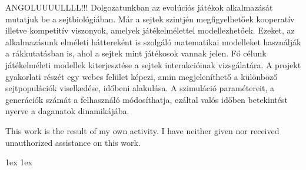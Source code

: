 \documentclass[final]{ubb_dolgozat}
\author{%
Kis Nándor
}
\renewcommand{\baselinestretch}{1.5}
\begin{document}
\begin{abstractEN} %



{	ANGOLUUUULLLL!!!
	Dolgozatunkban az evolúciós játékok alkalmazását mutatjuk be a sejtbiológiában. Már a sejtek szintjén megfigyelhetőek kooperatív illetve kompetitív viszonyok, amelyek játékelmélettel modellezhetőek. Ezeket, az alkalmazásunk elméleti háttereként is szolgáló matematikai modelleket használják a rákkutatásban is, ahol a sejtek mint játékosok vannak jelen. Fő célunk játékelméleti modellek kiterjesztése a sejtek interakcióinak vizsgálatára. A projekt gyakorlati részét egy webes felület képezi, amin megjeleníthető a különböző sejtpopulációk viselkedése, időbeni alakulása. A szimuláció paramétereit, a generációk számát a felhasználó módosíthatja, ezáltal valós időben betekintést nyerve a daganatok dinamikájába.
}

This work is the result of my own activity. I have neither given nor received unauthorized assistance on this work.

\end{abstractEN}

\maketitle


{ \baselineskip 1ex
  \parskip 1ex
  \tableofcontents
}








{ \renewcommand{\baselinestretch}{0.8}\normalsize %
  \setlength{\itemsep}{-2.4mm}
  \setlength{\bibspacing}{0.67\baselineskip}
  
  
}
\end{document}

